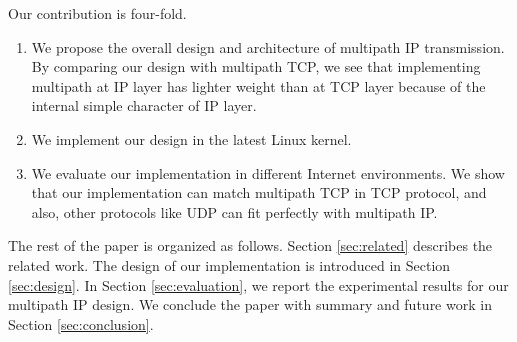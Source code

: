 Our contribution is four-fold.
\begin{enumerate}
\item We propose the overall design and architecture of multipath IP transmission. By comparing our design with multipath TCP, we see that implementing multipath at IP layer has lighter weight than at TCP layer because of the internal simple character of IP layer.

\item We implement our design in the latest Linux kernel. 

\item We evaluate our implementation in different Internet environments. We show that our implementation can match multipath TCP in TCP protocol, and also, other protocols like UDP can fit perfectly with multipath IP.
\end{enumerate}

The rest of the paper is organized as follows. Section \ref{sec:related} describes the related work.
The design of our implementation is introduced in Section \ref{sec:design}. In Section \ref{sec:evaluation}, we report the experimental results for our multipath IP design. We conclude the paper with summary and future work in Section \ref{sec:conclusion}.
